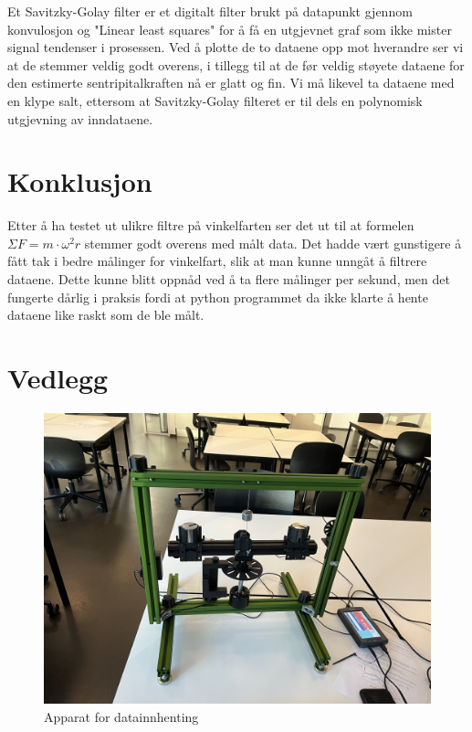 \documentclass{article}
\begin{document}
Et Savitzky-Golay filter er et digitalt filter brukt på datapunkt gjennom konvulosjon og "Linear least squares" 
for å få en utgjevnet graf som ikke mister signal tendenser i prosessen. Ved å plotte de to dataene opp mot hverandre ser 
vi at de stemmer veldig godt overens, i tillegg til at de før veldig støyete dataene for den estimerte sentripitalkraften 
nå er glatt og fin. Vi må likevel ta dataene med en klype salt, ettersom at Savitzky-Golay filteret er til dels en polynomisk 
utgjevning av inndataene.

\section{Konklusjon}
Etter å ha testet ut ulikre filtre på vinkelfarten ser det ut til at formelen $\Sigma F = m\cdot \omega^2r$ 
stemmer godt overens med målt data. Det hadde vært gunstigere å fått tak i bedre målinger for vinkelfart, 
slik at man kunne unngåt å filtrere dataene. Dette kunne blitt oppnåd ved å ta flere målinger per sekund, 
men det fungerte dårlig i praksis fordi at python programmet da ikke klarte å hente dataene like raskt 
som de ble målt.

\section{Vedlegg}

\begin{figure}[H]
    \centering
    \includegraphics[width=12cm]{apparat.jpg}
    \caption{Apparat for datainnhenting}
    \label{fig:picture}
\end{figure}
\end{document}

